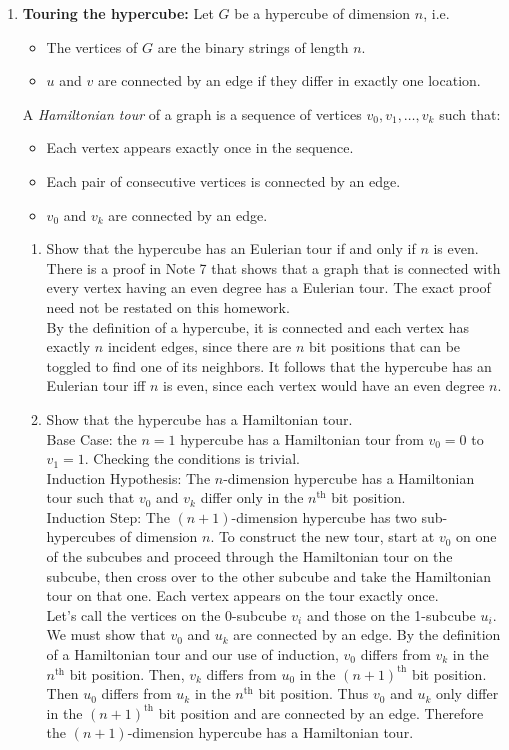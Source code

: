 \documentclass[11pt,fleqn]{article}
\begin{document}
\begin{enumerate}
\newpage
\item \textbf{Touring the hypercube:} 
Let $G$ be a hypercube of dimension $n$, i.e.
\begin{itemize}
\item The vertices of $G$ are the binary strings of length $n$.
\item $u$ and $v$ are connected by an edge if they differ in exactly one location.
\end{itemize}
A \emph{Hamiltonian tour} of a graph is a sequence of vertices
$v_0, v_1, \ldots, v_k$ such that:
\begin{itemize}
\item Each vertex appears exactly once in the sequence.
\item Each pair of consecutive vertices is connected by an edge.
\item $v_0$ and $v_k$ are connected by an edge.
\end{itemize}
\begin{enumerate}
\item Show that the hypercube has an Eulerian tour if and only if $n$ is even. \\
There is a proof in Note 7 that shows that a graph that is connected with every vertex having an even degree has a Eulerian tour. The exact proof need not be restated on this homework. \\
By the definition of a hypercube, it is connected and each vertex has exactly $n$ incident edges, since there are $n$ bit positions that can be toggled to find one of its neighbors. It follows that the hypercube has an Eulerian tour iff $n$ is even, since each vertex would have an even degree $n$.
\item Show that the hypercube has a Hamiltonian tour. \\
Base Case: the $n=1$ hypercube has a Hamiltonian tour from $v_0 = 0$ to $v_1 = 1$. Checking the conditions is trivial. \\
Induction Hypothesis: The $n$-dimension hypercube has a Hamiltonian tour such that $v_0$ and $v_k$ differ only in the $n^{\text{th}}$ bit position. \\
Induction Step: The $(n+1)$-dimension hypercube has two sub-hypercubes of dimension $n$. To construct the new tour, start at $v_0$ on one of the subcubes and proceed through the Hamiltonian tour on the subcube, then cross over to the other subcube and take the Hamiltonian tour on that one. Each vertex appears on the tour exactly once. \\
Let's call the vertices on the 0-subcube $v_i$ and those on the 1-subcube $u_i$. We must show that $v_0$ and $u_k$ are connected by an edge. By the definition of a Hamiltonian tour and our use of induction, $v_0$ differs from $v_k$ in the $n^{\text{th}}$ bit position. Then, $v_k$ differs from $u_0$ in the $(n+1)^{\text{th}}$ bit position. Then $u_0$ differs from $u_k$ in the $n^{\text{th}}$ bit position. Thus $v_0$ and $u_k$ only differ in the $(n+1)^{\text{th}}$ bit position and are connected by an edge. Therefore the $(n+1)$-dimension hypercube has a Hamiltonian tour.

\end{enumerate}
\end{enumerate}
\end{document}
